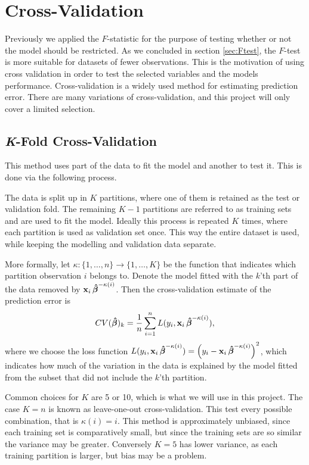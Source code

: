 \section{Cross-Validation}
Previously we applied the $F$-statistic for the purpose of testing whether or not the model should be restricted. 
As we concluded in section \ref{sec:Ftest}, the $F$-test is more suitable for datasets of fewer observations. 
This is the motivation of using cross validation in order to test the selected variables and the models performance.
Cross-validation is a widely used method for estimating prediction error.
There are many variations of cross-validation, and this project will only cover a limited selection. 

\subsection{\textit{K}-Fold Cross-Validation}

This method uses part of the data to fit the model and another to test it. This is done via the following process.

The data is split up in $K$ partitions, where one of them is retained as the test or validation fold. 
The remaining $K-1$ partitions are referred to as training sets and are used to fit the model.
Ideally this process is repeated $K$ times, where each partition is used as validation set once. 
This way the entire dataset is used, while keeping the modelling and validation data separate. 

More formally, let $\kappa: \{1, \ldots, n\} \rightarrow \{1, \ldots, K\}$ be the function that indicates which partition observation $i$ belongs to. 
Denote the model fitted with the $k$'th part of the data removed by $\textbf{x}_i \operatorname{\boldsymbol{\hat{\beta}}}^{-\kappa(i)}$. 
Then the cross-validation estimate of the prediction error is 
\begin{align*}
    CV(\operatorname{\boldsymbol{\hat{\beta}}})_k = \frac{1}{n} \sum_{i=1}^n L(y_i, \textbf{x}_i \operatorname{\boldsymbol{\hat{\beta}}}^{-\kappa(i)}),
\end{align*}
where we choose the loss function $L(y_i, \textbf{x}_i \operatorname{\boldsymbol{\hat{\beta}}}^{-\kappa(i)})=\left(y_i - \textbf{x}_i \operatorname{\boldsymbol{\hat{\beta}}}^{-\kappa(i)}\right)^2$, which indicates how much of the variation in the data is explained by the model fitted from the subset that did not include the $k$'th partition. 

Common choices for $K$ are 5 or 10, which is what we will use in this project. 
The case $K = n$ is known as leave-one-out cross-validation. 
This test every possible combination, that is $\kappa(i) = i$. 
This method is approximately unbiased, since each training set is comparatively small, but since the training sets are so similar the variance may be greater. 
Conversely $K=5$ has lower variance, as each training partition is larger, but bias may be a problem. 




